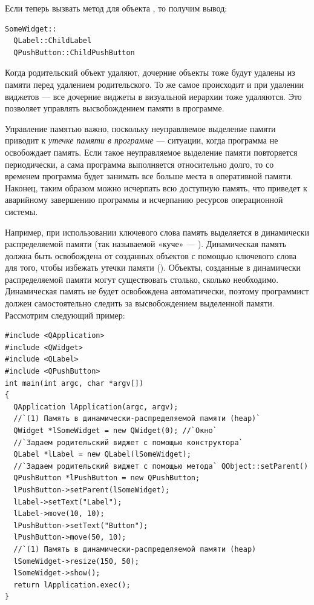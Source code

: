 Если теперь вызвать метод  для объекта , то получим вывод:
\begin{lstlisting}
SomeWidget:: 
  QLabel::ChildLabel 
  QPushButton::ChildPushButton 
\end{lstlisting}

Когда родительский объект удаляют, дочерние объекты тоже будут удалены из памяти перед удалением родительского. То же
самое происходит и при удалении виджетов --- все дочерние виджеты в визуальной иерархии тоже удаляются. Это позволяет
управлять высвобождением памяти в программе.

Управление памятью важно, поскольку неуправляемое выделение памяти приводит к \emph{утечке памяти
в программе} --- ситуации, когда программа не освобождает память. Если такое неуправляемое выделение памяти повторяется
периодически, а сама программа выполняется относительно долго, то со временем программа будет занимать все больше места
в оперативной памяти. Наконец, таким образом можно исчерпать всю доступную память, что приведет к аварийному завершению
программы и исчерпанию ресурсов операционной системы.

Например, при использовании ключевого слова  память выделяется в динамически распределяемой памяти (так называемой «куче» --- ). Динамическая память должна быть
освобождена от созданных объектов с помощью ключевого слова  для того, чтобы избежать утечки памяти
(). Объекты, созданные в динамически распределяемой памяти могут существовать столько, сколько
необходимо. Динамическая память не будет освобождена автоматически, поэтому программист должен самостоятельно следить
за высвобождением выделенной памяти. Рассмотрим следующий пример:
\begin{lstlisting}
#include <QApplication>
#include <QWidget>
#include <QLabel>
#include <QPushButton>
int main(int argc, char *argv[])
{
  QApplication lApplication(argc, argv);
  //`(1) Память в динамически-распределяемой памяти (heap)`
  QWidget *lSomeWidget = new QWidget(0); //`Окно`
  //`Задаем родительский виджет с помощью конструктора`
  QLabel *lLabel = new QLabel(lSomeWidget);
  //`Задаем родительский виджет с помощью метода` QObject::setParent()
  QPushButton *lPushButton = new QPushButton;
  lPushButton->setParent(lSomeWidget);
  lLabel->setText("Label");
  lLabel->move(10, 10);
  lPushButton->setText("Button");
  lPushButton->move(50, 10);
  //`(1) Память в динамически-распределяемой памяти (heap)
  lSomeWidget->resize(150, 50);
  lSomeWidget->show();
  return lApplication.exec();
}
\end{lstlisting}

